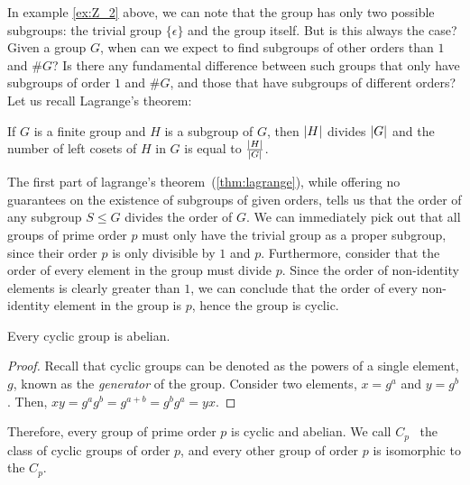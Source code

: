 In example \ref{ex:Z_2} above, we can note that the group has only two possible
subgroups: the trivial group $\{ \epsilon \}$ and the group itself.
But is this always the case?
Given a group $G$, when can we expect to find subgroups of other orders than $1$ and $\#G$?
Is there any fundamental difference between such groups that only have subgroups of order $1$ 
and $\#G$, and those that have subgroups of different orders?
Let us recall Lagrange's theorem:
\begin{theorem}[Lagrange]\label{thm:lagrange}
  If $G$ is a finite group and $H$ is a subgroup of $G$,
  then $\lvert H\rvert$ divides $\lvert G\rvert$ and the number of left cosets of $H$
  in $G$ is equal to $\frac{\lvert H\rvert}{\lvert G\rvert}$.~\cite[p.89, Theorem 8]{DummitFoote}
\end{theorem}
The first part of lagrange's theorem~(\ref{thm:lagrange}), while offering no guarantees on the existence of
subgroups of given orders, tells us that the order of any
subgroup $S \le G$ divides the order of $G$.
We can immediately pick out that all groups of prime order $p$ must only have the
trivial group as a proper subgroup, since their order $p$ is only divisible by $1$ and $p$.
Furthermore, consider that the order of every element in the group must divide $p$.
Since the order of non-identity elements is clearly greater than $1$, we can conclude
that the order of every non-identity element in the group is $p$, hence the group is cyclic.

\newpage
\begin{theorem}\label{thm:cyclic-abelian}
  Every cyclic group is abelian.
\end{theorem}

\begin{proof}
  Recall that cyclic groups can be denoted as the powers of a single element, $g$,
  known as the \emph{generator} of the group.
  Consider two elements, $x = g^a$ and $y = g^b$.
  Then, $xy = g^a g^b = g^{a+b} = g^b g^a = yx$.
\end{proof}

Therefore, every group of prime order $p$ is cyclic and abelian.
We call $C_p$~\label{def:C_p} the class of cyclic groups of order $p$,
and every other group of order $p$ is isomorphic to the $C_p$.

